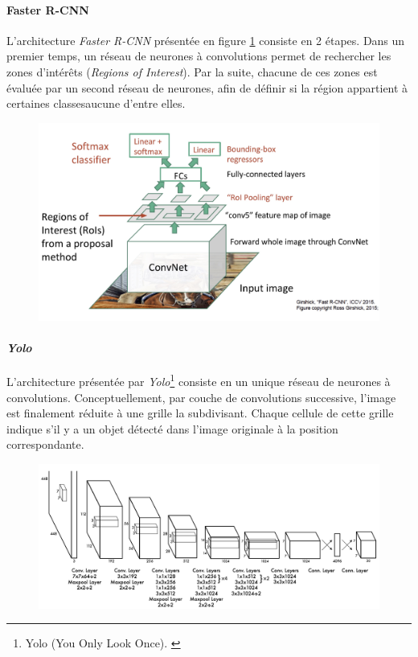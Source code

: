 \paragraph{Faster R-CNN}

L'architecture \textit{Faster R-CNN}\autocite{faster-rcnn} présentée en figure \ref{fig:faster-rcnn} consiste en 2 étapes. Dans un premier temps, un réseau de neurones à convolutions permet de rechercher les zones d'intérêts (\textit{Regions of Interest}). Par la suite, chacune de ces zones est évaluée par un second réseau de neurones, afin de définir si la région appartient à certaines classesaucune d'entre elles.

\begin{figure}[ht]
    \includegraphics[width=120mm]{img/bases_technologiques/faster-rcnn.jpg}
    \centering
    \label{fig:faster-rcnn}
\end{figure}


\paragraph{\textit{Yolo}}

L'architecture présentée par \textit{Yolo}\footnote{Yolo (You Only Look Once). \autocite{yolov3}} consiste en un unique réseau de neurones à convolutions. Conceptuellement, par couche de convolutions successive, l'image est finalement réduite à une grille la subdivisant. Chaque cellule de cette grille indique s'il y a un objet détecté dans l'image originale à la position correspondante. \autocite{coursera:object}

\begin{figure}[ht]
    \includegraphics[width=120mm]{img/bases_technologiques/yolo.png}
    \centering
    \label{fig:yolo}
\end{figure}
